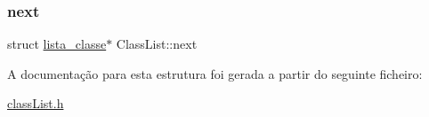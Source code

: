 \subsubsection{\texorpdfstring{next}{next}}
{\footnotesize\ttfamily struct \hyperlink{class_list_8h_abd6e86b261bfff4b12ad1311d1e16e96}{lista\+\_\+classe}$\ast$ Class\+List\+::next}



A documentação para esta estrutura foi gerada a partir do seguinte ficheiro\+:\begin{DoxyCompactItemize}
\item 
\hyperlink{class_list_8h}{class\+List.\+h}\end{DoxyCompactItemize}
